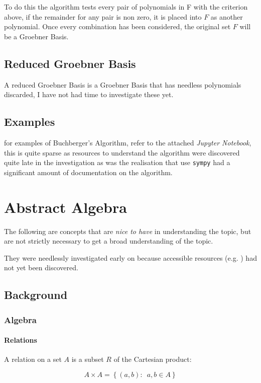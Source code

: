 \documentclass[a4paper,11pt,twoside]{article}
\begin{document}
To do this the algorithm tests every pair of polynomials in F with
the criterion above, if the remainder for any pair is non zero,
it is placed into \(F\) as another polynomial. 
Once every combination has been considered, the original set
\(F\) will be a Groebner Basis.

\subsection{Reduced Groebner Basis}
\label{sec:orge480699}
A reduced Groebner Basis is a Groebner Basis that has needless
polynomials discarded, I have not had time to investigate these
yet.

\subsection{Examples}
\label{sec:org661585e}
for examples of Buchberger's Algorithm, refer to the attached
\emph{Jupyter Notebook}, this is quite sparse as resources to understand
the algorithm were discovered quite late in the investigation as
was the realisation that use \texttt{sympy} had a significant amount of
documentation on the algorithm.
\section{Abstract Algebra}
\label{sec:orga0cf1ff}
The following are concepts that are \emph{nice to have} in understanding
the topic, but are not strictly necessary to get a broad
understanding of the topic.

They were needlessly investigated early on because accessible
resources
(e.g. \cite{coxIdealsVarietiesAlgorithms1997,andreasschulzIntegerProgrammingCombinatorial,sympydevelopmentteamSympyPolysGroebnertools})
had not yet been discovered.
\subsection{Background}
\label{sec:orgc527a3f}
\subsubsection{Algebra}
\label{sec:orgad4dad2}
\paragraph{Relations}
\label{sec:orgae5d2e1}
A relation on a set \(A\) is a subset \(R\) of the Cartesian
product:

\[
     A\times A=\left\{ \left(a,b\right):\enspace a,b\in A\right\}
     \]
\end{document}
